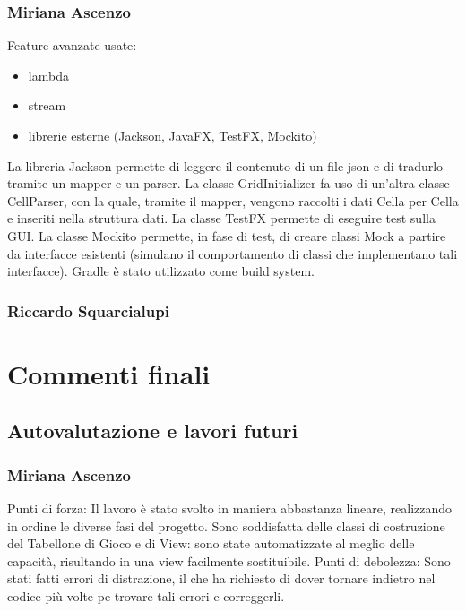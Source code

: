 \documentclass[a4paper,12pt]{report}
\begin{document}
	\subsection{Miriana Ascenzo}

	Feature avanzate usate:
	\begin{itemize}
		\item lambda
		\item stream
		\item librerie esterne (Jackson, JavaFX, TestFX, Mockito)
	\end {itemize}
	La libreria Jackson permette di leggere il contenuto di un file json e di tradurlo tramite un mapper e un parser.
	La classe GridInitializer fa uso di un’altra classe CellParser, con la quale, tramite il mapper, vengono raccolti i dati Cella per Cella e inseriti nella struttura dati.
	La classe TestFX permette di eseguire test sulla GUI.
	La classe Mockito permette, in fase di test, di creare classi Mock a partire da interfacce esistenti (simulano il comportamento di classi che implementano tali interfacce).
    Gradle è stato utilizzato come build system.

	\subsection{Riccardo Squarcialupi}

	\chapter{Commenti finali}

    \section{Autovalutazione e lavori futuri}

    \subsection{Miriana Ascenzo}
    Punti di forza:
    Il lavoro è stato svolto in maniera abbastanza lineare, realizzando in ordine le diverse fasi del progetto.
    Sono soddisfatta delle classi di costruzione del Tabellone di Gioco e di View:
    sono state automatizzate al meglio delle capacità, risultando in una view facilmente sostituibile.\newline
    Punti di debolezza:
    Sono stati fatti errori di distrazione, il che ha richiesto di dover tornare indietro nel codice più volte pe trovare tali errori e correggerli.
\end{document}
